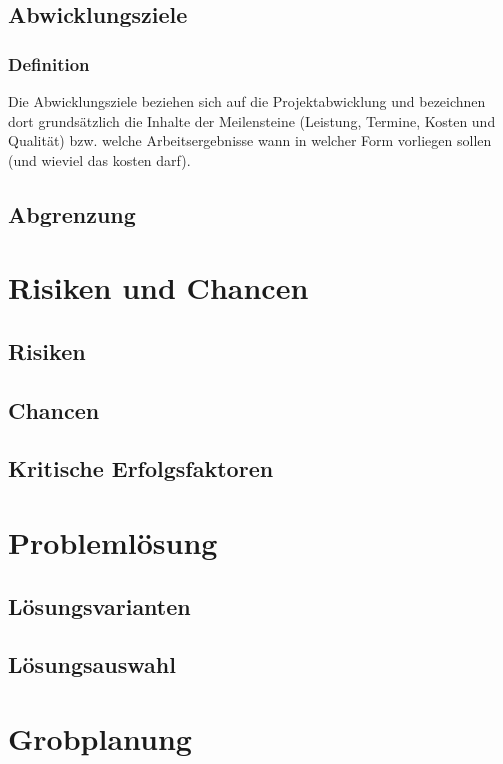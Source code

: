 \subsection{Abwicklungsziele}
\subsubsection{Definition}
Die Abwicklungsziele beziehen sich auf die Projektabwicklung und bezeichnen dort grundsätzlich die Inhalte der Meilensteine (Leistung, Termine, Kosten und Qualität) bzw. welche Arbeitsergebnisse wann in welcher Form vorliegen sollen (und wieviel das kosten darf).

\subsection{Abgrenzung}


\section{Risiken und Chancen}

\subsection{Risiken}

\subsection{Chancen}

\subsection{Kritische Erfolgsfaktoren}


\section{Problemlösung}

\subsection{Lösungsvarianten}

\subsection{Lösungsauswahl}


\section{Grobplanung}

